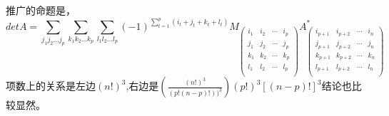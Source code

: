\documentclass{amsc}          %
\numberwithin{equation}{section} %
\begin{document}
推广的命题是，
$$detA=\sum\limits_{j_{1}j_{2}...j_{p}} \sum\limits_{k_{1}k_{2}...k_{p}} \sum\limits_{l_{1}l_{2}...l_{p}}
(-1)^{\sum_{t=1}^{p}(i_{t}+j_{t}+k_{t}+l_{t})}
M_{\left(\begin{array}{cccc}
i_{1} & i_{2} & \cdots & i_{p} \\
j_{1} & j_{2} & \cdots & j_{p} \\
k_{1} & k_{2} & \cdots & k_{p} \\
l_{1} & l_{2} & \cdots & l_{p} \\
\end{array}\right)}
A^{*}_{\left(\begin{array}{cccc}
i_{p+1} & i_{p+2} & \cdots & i_{n} \\
j_{p+1} & j_{p+2} & \cdots & j_{n} \\
k_{p+1} & k_{p+2} & \cdots & k_{n} \\
l_{p+1} & l_{p+2} & \cdots & l_{n} \\
\end{array}\right)}$$
项数上的关系是左边$(n!)^{3}$,右边是$(\frac{(n!)^{3}}{(p!(n-p)!))^{3}})(p!)^{3}[(n-p)!]^{3}$结论也比较显然。
\end{document}
